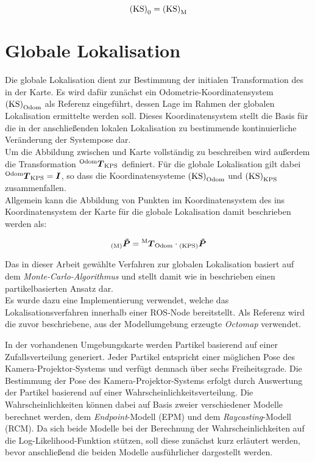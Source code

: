 \begin{equation}
{\mathrm{(KS)}}_{\mathrm{0}} = {\mathrm{(KS)}}_{\mathrm{M}}
\end{equation}

\section{Globale Lokalisation}
\label{chap.globloc}
Die globale Lokalisation dient zur Bestimmung der initialen Transformation des  in der Karte. Es wird dafür zunächst ein Odometrie-Koordinatensystem ${\mathrm{(KS)}}_{\mathrm{Odom}}$ als Referenz eingeführt, dessen Lage im Rahmen der globalen Lokalisation ermittelte werden soll. Dieses Koordinatensystem stellt die Basis für die in der anschließenden lokalen Lokalisation zu bestimmende kontinuierliche Veränderung der Systempose dar.\\
Um die Abbildung zwischen \kps{} und Karte vollständig zu beschreiben wird außerdem die Transformation ${^{\mathrm{Odom}}\mbox{\boldmath{$T$}}_{\mathrm{KPS}}}$ definiert. Für die globale Lokalisation gilt dabei ${^{\mathrm{Odom}}\mbox{\boldmath{$T$}}_{\mathrm{KPS}}} = \mbox{\boldmath{$I$}}$, so dass die Koordinatensysteme ${\mathrm{(KS)}}_{\mathrm{Odom}}$ und ${\mathrm{(KS)}}_{\mathrm{KPS}}$ zusammenfallen.\\
Allgemein kann die Abbildung von Punkten im Koordinatensystem des  ins Koordinatensystem der Karte für die globale Lokalisation damit beschrieben werden als:

\begin{equation}
{_{{\mathrm{(M)}}}}\mbox{\boldmath{$\tilde{P}$}} = {^{\mathrm{M}}\mbox{\boldmath{$T$}}_{\mathrm{Odom}}} \cdot {_{{\mathrm{(KPS)}}}}\mbox{\boldmath{$\tilde{P}$}}
\label{eq.globloc}
\end{equation}


Das in dieser Arbeit gewählte Verfahren zur globalen Lokalisation basiert auf dem \textit{Monte-Carlo-Algorithmus} \cite{Dellaert1999} und stellt damit wie in  beschrieben einen partikelbasierten Ansatz dar.\\
Es wurde dazu eine Implementierung \cite{humanoidNavigation} verwendet, welche das Lokalisationsverfahren innerhalb einer ROS-Node bereitstellt. Als Referenz wird die zuvor beschriebene, aus der Modellumgebung erzeugte \textit{Octomap} verwendet.\\

\prever{
}

In der vorhandenen Umgebungskarte werden Partikel basierend auf einer Zufallsverteilung generiert. Jeder Partikel entspricht einer möglichen Pose des Kamera-Projektor-Systems und verfügt demnach über sechs Freiheitsgrade. Die Bestimmung der Pose des Kamera-Projektor-Systems erfolgt durch Auswertung der Partikel basierend auf einer Wahrscheinlichkeitsverteilung. Die Wahrscheinlichkeiten können dabei auf Basis zweier verschiedener Modelle berechnet werden, dem \textit{Endpoint}-Modell (EPM) und dem \textit{Raycasting}-Modell (RCM). Da sich beide Modelle bei der Berechnung der Wahrscheinlichkeiten auf die Log-Likelihood-Funktion stützen, soll diese zunächst kurz erläutert werden, bevor anschließend die beiden Modelle ausführlicher dargestellt werden.


